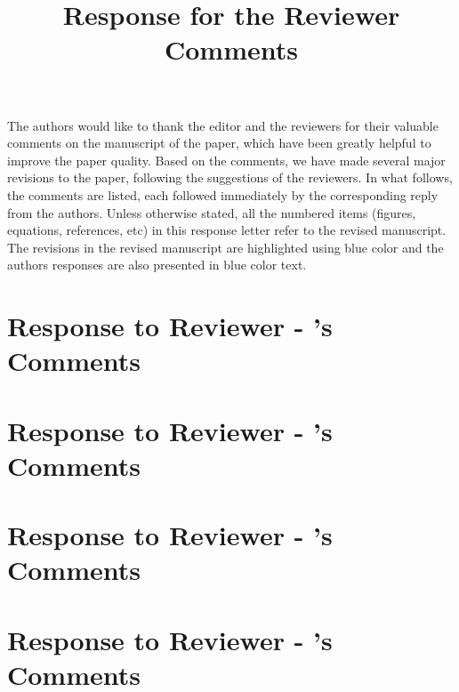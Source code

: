 \documentclass[10pt,letterpaper,onecolumn]{IEEEtran}
\begin{document}
\doublespacing

\title{Response for the Reviewer Comments}

\maketitle

The authors would like to thank the editor and the reviewers for their valuable comments on the manuscript of the paper, which have been greatly helpful to improve the paper quality. Based on the comments, we have made several major revisions to the paper, following the suggestions of the reviewers. In what follows, the comments are listed, each followed immediately by the corresponding reply from the authors. Unless otherwise stated, all the numbered items (figures, equations, references, etc) in this response letter refer to the revised manuscript. The revisions in the revised manuscript are highlighted using blue color and the authors responses are also presented in blue color text.

\newpage
\section*{Response to Reviewer - 's Comments}


\newpage
\section*{Response to Reviewer - 's Comments}


\newpage
\section*{Response to Reviewer - 's Comments}


\newpage
\section*{Response to Reviewer - 's Comments}

\end{document}
